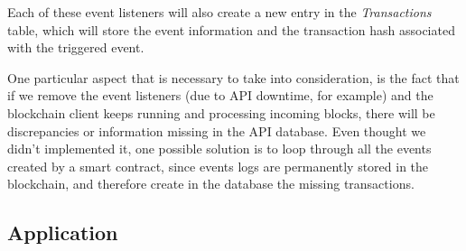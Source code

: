 Each of these event listeners will also create a new entry in the \textit{Transactions} table, which will store the event information and the transaction hash associated with the triggered event.

One particular aspect that is necessary to take into consideration, is the fact that if we remove the event listeners (due to API downtime, for example) and the blockchain client keeps running and processing incoming blocks, there will be discrepancies or information missing in the API database.
Even thought we didn't implemented it, one possible solution is to loop through all the events created by a smart contract, since events logs are permanently stored in the blockchain, and therefore create in the database the missing transactions.

\subsection{Application}\label{subsection:mapp}


